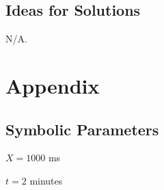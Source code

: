 \documentclass[12pt, titlepage]{article}
\begin{document}
\subsection{Ideas for Solutions}
N/A.




\newpage

\section{Appendix}

\subsection{Symbolic Parameters}
    \item $X = 1000$ ms
    \item $t = 2$ minutes 
\end{document}
